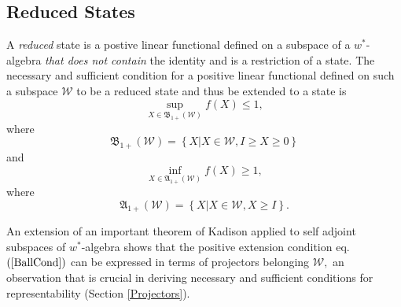 \documentclass[aps,preprint]{revtex4}%
\begin{document}
\subsection{Reduced States \label{Reduced States}}

A \emph{reduced} state is a postive linear functional defined on a subspace of
a $w^{\ast}$-algebra \emph{that does not contain} the identity and is a
restriction of a state. The necessary and sufficient condition \cite{Segal}
for a positive linear functional defined on such a subspace $\mathcal{W}$ to
be a reduced state and thus be extended to a state is
\begin{equation}
\sup_{X\in\mathfrak{B}_{1+}\left(  \mathcal{W}\right)  }f\left(  X\right)
\leq1,
\end{equation}
where
\begin{equation}
\mathfrak{B}_{1+}\left(  \mathcal{W}\right)  =\left\{  \left.  X\right\vert
X\in\mathcal{W},I\geq X\geq0\right\}  \label{BallCond}%
\end{equation}
and%
\begin{equation}
\inf_{X\in\mathfrak{A}_{1+}\left(  \mathcal{W}\right)  }f\left(  X\right)
\geq1,
\end{equation}
where
\begin{equation}
\mathfrak{A}_{1+}\left(  \mathcal{W}\right)  =\left\{  \left.  X\right\vert
X\in\mathcal{W},X\geq I\right\}  . \label{AnnCon}%
\end{equation}


An extension of an important theorem of Kadison \cite{Kadison} applied to self
adjoint subspaces of $w^{\ast}$-algebra shows that the positive extension
condition eq.$\left(  \ref{BallCond}\right)  $ can be expressed in terms of
projectors belonging $\mathcal{W},$ an observation that is crucial in deriving
necessary and sufficient conditions for representability (Section
\ref{Projectors}).
\end{document}
